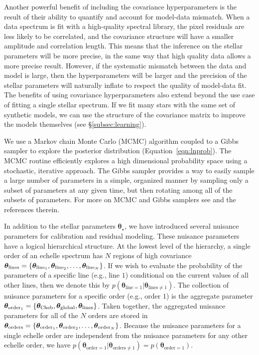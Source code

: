 \documentclass[iop,floatfix]{emulateapj}
\newcommand{\vt}{ {\bm \theta}}
\newcommand{\vtstar}{\vt_{\star}}
\newcommand{\vtcheb}{\vt_{\rm Cheb}}
\newcommand{\vtglobal}{\vt_{\rm global}}
\newcommand{\vtorder}[1]{\vt_{{\rm order}_{#1}}}
\newcommand{\vtorders}{\vt_{\rm orders}}
\newcommand{\vtline}[1]{\vt_{{\rm line}_{#1}}}
\newcommand{\vtlines}{\vt_{\rm lines}}
\begin{document}
Another powerful benefit of including the covariance hyperparameters is the result of their ability to quantify and account for model-data mismatch. When a data spectrum is fit with a high-quality spectral library, the pixel residuals are less likely to be correlated, and the covariance structure will have a smaller amplitude and correlation length. This means that the inference on the stellar parameters will be more precise, in the same way that high quality data allows a more precise result. However, if the systematic mismatch between the data and model is large, then the hyperparameters will be larger and the precision of the stellar parameters will naturally inflate to respect the quality of model-data fit. The benefits of using covariance hyperparameters also extend beyond the use case of fitting a single stellar spectrum. If we fit many stars with the same set of synthetic models, we can use the structure of the covariance matrix to improve the models themselves (see \S\ref{subsec:learning}).

We use a Markov chain Monte Carlo (MCMC) algorithm coupled to a Gibbs sampler to explore the posterior distribution (Equation~\ref{eqn:lnprob}). The MCMC routine efficiently explores a high dimensional probability space using a stochastic, iterative approach. The Gibbs sampler provides a way to easily sample a large number of parameters in a simple, organized manner by sampling only a subset of parameters at any given time, but then rotating among all of the subsets of parameters. For more on MCMC and Gibbs samplers see \citet[Ch. 11]{gelman13} and the references therein. 

In addition to the stellar parameters $\vtstar$, we have introduced several nuisance parameters for calibration and residual modeling. These nuisance parameters have a logical hierarchical structure. At the lowest level of the hierarchy, a single order of an echelle spectrum has $N$ regions of high covariance $\vtlines = \{\vtline{1}, \vtline{2}, \ldots, \vtline{N}\}$. If we wish to evaluate the probability of the parameters of a specific line (e.g., line $1$) conditional on the current values of all other lines, then we denote this by $p(\vt_{\textrm{line} = 1} | \vt_{\textrm{lines} \ne 1})$. The collection of nuisance parameters for a specific order  (e.g., order $1$) is the aggregate parameter $\vtorder{1} = \{\vtcheb, \vtglobal, \vtlines\}$. Taken together, the aggregated nuisance parameters for all of the $N$ orders are stored in $\vtorders = \{\vtorder{1}, \vtorder{2}, \ldots, \vtorder{N} \}$. Because the nuisance parameters for a single echelle order are independent from the nuisance parameters for any other echelle order, we have $p(\vt_{\textrm{order} = 1} | \vt_{\textrm{orders} \ne 1}) = p(\vt_{\textrm{order} = 1})$. 
\end{document}
